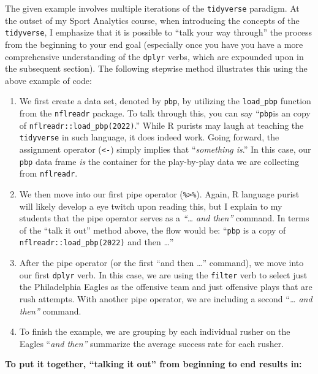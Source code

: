 \documentclass[
  letterpaper,
]{krantz}
\providecommand{\tightlist}{%
  \setlength{\itemsep}{0pt}\setlength{\parskip}{0pt}}\usepackage{longtable,booktabs,array}
\begin{document}
The given example involves multiple iterations of the \texttt{tidyverse}
paradigm. At the outset of my Sport Analytics course, when introducing
the concepts of the \texttt{tidyverse}, I emphasize that it is possible
to ``talk your way through'' the process from the beginning to your end
goal (especially once you have you have a more comprehensive
understanding of the \texttt{dplyr} verbs, which are expounded upon in
the subsequent section). The following stepwise method illustrates this
using the above example of code:

\begin{enumerate}
\def\labelenumi{\arabic{enumi}.}
\tightlist
\item
  We first create a data set, denoted by \texttt{pbp}, by utilizing the
  \texttt{load\_pbp} function from the \texttt{nflreadr} package. To
  talk through this, you can say ``\texttt{pbp}is an copy of
  \texttt{nflreadr::load\_pbp(2022)}.'' While R purists may laugh at
  teaching the \texttt{tidyverse} in such language, it does indeed work.
  Going forward, the assignment operator (\texttt{\textless{}-}) simply
  implies that ``\emph{something is}.'' In this case, our \texttt{pbp}
  data frame \emph{is} the container for the play-by-play data we are
  collecting from \texttt{nflreadr}.
\item
  We then move into our first pipe operator
  (\texttt{\%\textgreater{}\%}). Again, R language purist will likely
  develop a eye twitch upon reading this, but I explain to my students
  that the pipe operator serves as a \emph{``\ldots{} and then''}
  command. In terms of the ``talk it out'' method above, the flow would
  be: ``\texttt{pbp} is a copy of \texttt{nflreadr::load\_pbp(2022)} and
  then \ldots{}''
\item
  After the pipe operator (or the first ``and then \ldots{}'' command),
  we move into our first \texttt{dplyr} verb. In this case, we are using
  the \texttt{filter} verb to select just the Philadelphia Eagles as the
  offensive team and just offensive plays that are rush attempts. With
  another pipe operator, we are including a second ``\emph{\ldots{} and
  then''} command.
\item
  To finish the example, we are grouping by each individual rusher on
  the Eagles ``\emph{and then''} summarize the average success rate for
  each rusher.
\end{enumerate}

\textbf{To put it together, ``talking it out'' from beginning to end
results in:}
\end{document}
